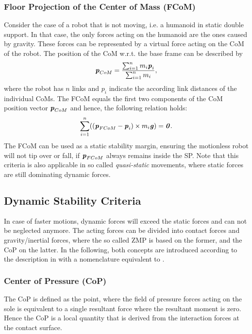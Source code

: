 \subsubsection{Floor Projection of the Center of Mass (FCoM)}
Consider the case of a robot that is not moving, i.e. a humanoid in static double support. In that case, the only forces acting on the humanoid are the ones caused by gravity. These forces can be represented by a virtual force acting on the \gls{CoM} of the robot. The position of the \gls{CoM} w.r.t. the base frame can be described by
\begin{equation*} 
\bm{\mathit{p}}_{CoM}=\dfrac{\sum_{i=1}^{n}m_i\bm{\mathit{p}}_i}{\sum_{i=1}^{n}m_i},
\end{equation*}
where the robot has $n$ links and $p_i$ indicate the according link distances of the individual \gls{CoM}s. The \gls{FCoM} equals the first two components of the \gls{CoM} position vector $\bm{\mathit{p}}_{CoM}$ and hence, the following relation holds:
\begin{equation*} 
\sum_{i=1}^{n}((\bm{\mathit{p}}_{FCoM}-\bm{\mathit{p}}_i)\times m_i\bm{\mathit{g}})=\bm{\mathit{0}}.
\end{equation*}
The \gls{FCoM} can be used as a static stability margin, ensuring the motionless robot will not tip over or fall, if $\bm{\mathit{p}}_{FCoM}$ always remains inside the \gls{SP}. Note that this criteria is also applicable in so called \textit{quasi-static} movements, where static forces are still dominating dynamic forces.

\subsection{Dynamic Stability Criteria}
In case of faster motions, dynamic forces will exceed the static forces and can not be neglected anymore. The acting forces can be divided into contact forces and gravity/inertial forces, where the so called \gls{ZMP} is based on the former, and the \gls{CoP} on the latter. In the following, both concepts are introduced according to the description in \cite{sardain2004forces} with a nomenclature equivalent to \cite{scaronTeaching}.
\subsubsection{Center of Pressure (CoP)}
The \gls{CoP} is defined as the point, where the field of pressure forces acting on the sole is equivalent to a single resultant force where the resultant moment is zero. Hence the \gls{CoP} is a local quantity that is derived from the interaction forces at the contact surface. 

